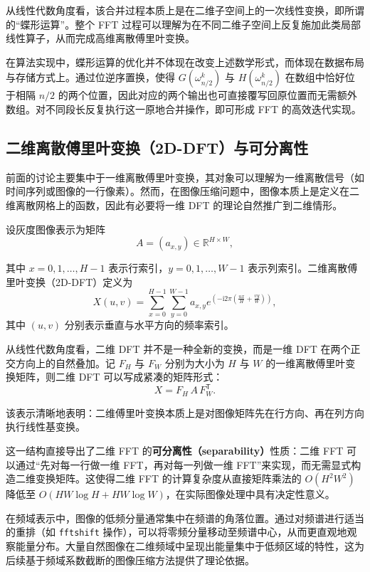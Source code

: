 \documentclass[12pt,a4paper]{article}
\begin{document}
从线性代数角度看，该合并过程本质上是在二维子空间上的一次线性变换，即所谓的“蝶形运算”。整个 FFT 过程可以理解为在不同二维子空间上反复施加此类局部线性算子，从而完成高维离散傅里叶变换。

在算法实现中，蝶形运算的优化并不体现在改变上述数学形式，而体现在数据布局与存储方式上。通过位逆序置换，使得 $G(\omega_{n/2}^k)$ 与 $H(\omega_{n/2}^k)$ 在数组中恰好位于相隔 $n/2$ 的两个位置，因此对应的两个输出也可直接覆写回原位置而无需额外数组。对不同段长反复执行这一原地合并操作，即可形成 FFT 的高效迭代实现。

\subsection{二维离散傅里叶变换（2D-DFT）与可分离性}

前面的讨论主要集中于一维离散傅里叶变换，其对象可以理解为一维离散信号（如时间序列或图像的一行像素）。然而，在图像压缩问题中，图像本质上是定义在二维离散网格上的函数，因此有必要将一维 DFT 的理论自然推广到二维情形。

设灰度图像表示为矩阵
\[
A = (a_{x,y}) \in \mathbb{R}^{H \times W},
\]

其中 $x=0,1,\dots,H-1$ 表示行索引，$y=0,1,\dots,W-1$ 表示列索引。二维离散傅里叶变换（2D-DFT）定义为
\begin{equation}
X(u,v)=\sum_{x=0}^{H-1}\sum_{y=0}^{W-1} a_{x,y}
e^{\left(-\mathrm{i}2\pi\left(\frac{ux}{H}+\frac{vy}{W}\right)\right)},
\end{equation}
其中 $(u,v)$ 分别表示垂直与水平方向的频率索引。

从线性代数角度看，二维 DFT 并不是一种全新的变换，而是一维 DFT 在两个正交方向上的自然叠加。记 $F_H$ 与 $F_W$ 分别为大小为 $H$ 与 $W$ 的一维离散傅里叶变换矩阵，则二维 DFT 可以写成紧凑的矩阵形式：
\begin{equation}
X = F_H \, A \, F_W^{\mathsf{T}}.
\end{equation}

该表示清晰地表明：二维傅里叶变换本质上是对图像矩阵先在行方向、再在列方向执行线性基变换。

这一结构直接导出了二维 FFT 的\textbf{可分离性（separability）}性质：二维 FFT 可以通过“先对每一行做一维 FFT，再对每一列做一维 FFT”来实现，而无需显式构造二维变换矩阵。这使得二维 FFT 的计算复杂度从直接矩阵乘法的 $O(H^2W^2)$ 降低至 $O(HW\log H + HW\log W)$，在实际图像处理中具有决定性意义。

在频域表示中，图像的低频分量通常集中在频谱的角落位置。通过对频谱进行适当的重排（如 \texttt{fftshift} 操作），可以将零频分量移动至频谱中心，从而更直观地观察能量分布。大量自然图像在二维频域中呈现出能量集中于低频区域的特性，这为后续基于频域系数截断的图像压缩方法提供了理论依据。
\end{document}
